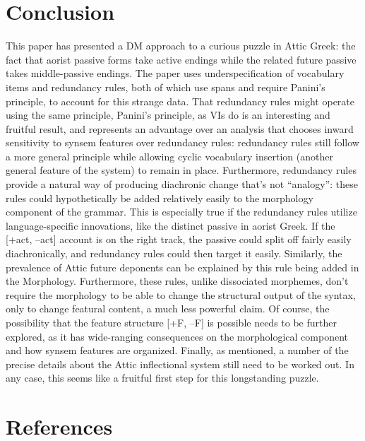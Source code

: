 \documentclass[]{ling-200b-2}
\begin{document}
\section{Conclusion}

This paper has presented a DM approach to a curious puzzle in Attic Greek: the fact that aorist passive forms take active endings while the related future passive takes middle-passive endings. The paper uses underspecification of vocabulary items and redundancy rules, both of which use spans and require Panini's principle, to account for this strange data. That redundancy rules might operate using the same principle, Panini's principle, as VIs do is an interesting and fruitful result, and represents an advantage over an analysis that chooses inward sensitivity to synsem features over redundancy rules: redundancy rules still follow a more general principle while allowing cyclic vocabulary insertion (another general feature of the system) to remain in place. Furthermore, redundancy rules provide a natural way of producing diachronic change that's not ``analogy'': these rules could hypothetically be added relatively easily to the morphology component of the grammar. This is especially true if the redundancy rules utilize language-specific innovations, like the distinct passive in aorist Greek. If the [+act, --act] account is on the right track, the passive could split off fairly easily diachronically, and redundancy rules could then target it easily. Similarly, the prevalence of Attic future deponents can be explained by this rule being added in the Morphology. Furthermore, these rules, unlike dissociated morphemes, don't require the morphology to be able to change the structural output of the syntax, only to change featural content, a much less powerful claim. Of course, the possibility that the feature structure [+F, --F] is possible needs to be further explored, as it has wide-ranging consequences on the morphological component and how synsem features are organized. Finally, as mentioned, a number of the precise details about the Attic inflectional system still need to be worked out. In any case, this seems like a fruitful first step for this longstanding puzzle.

\section{References}
\end{document}

